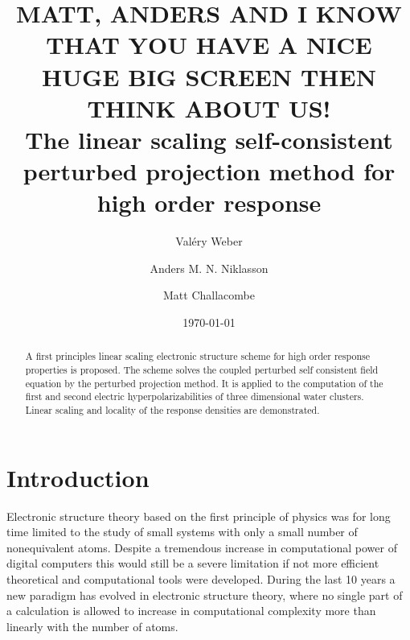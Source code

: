 \documentclass[prl,aps,twocolumn,showpacs,twocolumngrid,superbib]{revtex4}
\begin{document}

\title{MATT, ANDERS AND I KNOW THAT YOU HAVE A NICE HUGE BIG SCREEN THEN THINK ABOUT US!\\
The linear scaling self-consistent perturbed projection method for high order response}

\author{Val\'ery Weber}
\author{Anders M. N. Niklasson}%
\author{Matt Challacombe}%

%

\date{\today}%

\begin{abstract}
A first principles linear scaling electronic structure scheme for high order 
response properties is proposed. The scheme solves the coupled perturbed self 
consistent field equation by the perturbed projection method. It is applied to 
the computation of the first and second electric hyperpolarizabilities of three
dimensional water clusters. Linear scaling and locality of the response
densities are demonstrated. 
\end{abstract}

\maketitle


\section{Introduction}
 Electronic structure theory based on the first principle 
 of physics was for long time limited to the study of small 
 systems with only a small number of nonequivalent atoms. 
 Despite a tremendous increase in computational power
 of digital computers this would still be a severe limitation
 if not more efficient theoretical and computational
 tools were developed. During the last 10 years a new paradigm 
 has evolved in electronic structure theory, where
 no single part of a calculation is allowed to increase in 
 computational complexity more than linearly with the number
 of atoms. 
\end{document}
